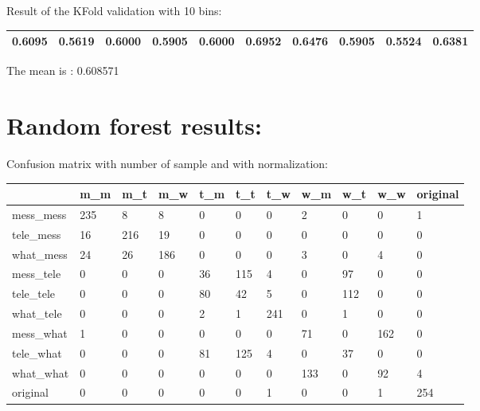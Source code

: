 Result of the KFold validation with 10 bins:
 {\def\arraystretch{1.3} 
 \begin{table}[H] 
\centering 
\begin{tabular}{|l |l |l |l |l |l |l |l |l |l |}  
\hline 
0.6095&
0.5619&
0.6000&
0.5905&
0.6000&
0.6952&
0.6476&
0.5905&
0.5524&
0.6381\\ \hline  

\end{tabular} 
\end{table} }

The mean is : 0.608571\section{Random forest results:} 
Confusion matrix with number of sample and with normalization:
 {\def\arraystretch{1.3} 
 \begin{table}[H] 
\centering 
\begin{tabular}{|l|l|l|l|l|l|l|l|l|l|l|} 
\hline 
  &m\_m  &m\_t  &m\_w  &t\_m  &t\_t  &t\_w  &w\_m  &w\_t  &w\_w  &original  \\ \hline
mess\_mess  &235  &8  &8  &0  &0  &0  &2  &0  &0  &1  \\ \hline
tele\_mess  &16  &216  &19  &0  &0  &0  &0  &0  &0  &0  \\ \hline
what\_mess  &24  &26  &186  &0  &0  &0  &3  &0  &4  &0  \\ \hline
mess\_tele  &0  &0  &0  &36  &115  &4  &0  &97  &0  &0  \\ \hline
tele\_tele  &0  &0  &0  &80  &42  &5  &0  &112  &0  &0  \\ \hline
what\_tele  &0  &0  &0  &2  &1  &241  &0  &1  &0  &0  \\ \hline
mess\_what  &1  &0  &0  &0  &0  &0  &71  &0  &162  &0  \\ \hline
tele\_what  &0  &0  &0  &81  &125  &4  &0  &37  &0  &0  \\ \hline
what\_what  &0  &0  &0  &0  &0  &0  &133  &0  &92  &4  \\ \hline
original  &0  &0  &0  &0  &0  &1  &0  &0  &1  &254  \\ \hline
\end{tabular} 
\end{table} }

